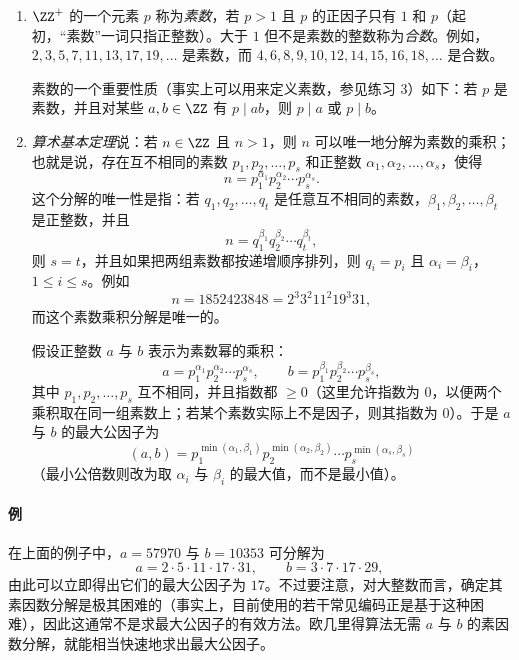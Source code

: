 \begin{enumerate}[label=(\arabic*),resume]
  \item $\ZZ^+$ 的一个元素 $p$ 称为\emph{素数}，若 $p>1$ 且 $p$ 的正因子只有 $1$ 和 $p$（起初，“素数”一词只指正整数）。大于 $1$ 但不是素数的整数称为\emph{合数}。例如，$2,3,5,7,11,13,17,19,\ldots$ 是素数，而 $4,6,8,9,10,12,14,15,16,18,\ldots$ 是合数。

  素数的一个重要性质（事实上可以用来定义素数，参见练习 3）如下：若 $p$ 是素数，并且对某些 $a,b\in\ZZ$ 有 $p\mid ab$，则 $p\mid a$ 或 $p\mid b$。

  \item \emph{算术基本定理}说：若 $n\in\ZZ$ 且 $n>1$，则 $n$ 可以唯一地分解为素数的乘积；也就是说，存在互不相同的素数 $p_1,p_2,\ldots,p_s$ 和正整数 $\alpha_1,\alpha_2,\ldots,\alpha_s$，使得
  \[
    n=p_1^{\alpha_1}p_2^{\alpha_2}\cdots p_s^{\alpha_s}.
  \]
  这个分解的唯一性是指：若 $q_1,q_2,\ldots,q_t$ 是任意互不相同的素数，$\beta_1,\beta_2,\ldots,\beta_t$ 是正整数，并且
  \[
    n=q_1^{\beta_1}q_2^{\beta_2}\cdots q_t^{\beta_t},
  \]
  则 $s=t$，并且如果把两组素数都按递增顺序排列，则 $q_i=p_i$ 且 $\alpha_i=\beta_i$，$1\leq i\leq s$。例如
  \[
    n=1852423848=2^3 3^2 11^2 19^3 31,
  \]
  而这个素数乘积分解是唯一的。

  假设正整数 $a$ 与 $b$ 表示为素数幂的乘积：
  \[
    a=p_1^{\alpha_1}p_2^{\alpha_2}\cdots p_s^{\alpha_s},
    \qquad
    b=p_1^{\beta_1}p_2^{\beta_2}\cdots p_s^{\beta_s},
  \]
  其中 $p_1,p_2,\ldots,p_s$ 互不相同，并且指数都 $\geq0$（这里允许指数为 $0$，以便两个乘积取在同一组素数上；若某个素数实际上不是因子，则其指数为 $0$）。于是 $a$ 与 $b$ 的最大公因子为
  \[
    (a,b)=p_1^{\min(\alpha_1,\beta_1)}p_2^{\min(\alpha_2,\beta_2)}\cdots p_s^{\min(\alpha_s,\beta_s)}
  \]
  （最小公倍数则改为取 $\alpha_i$ 与 $\beta_i$ 的最大值，而不是最小值）。
\end{enumerate}

\paragraph{例}
在上面的例子中，$a=57970$ 与 $b=10353$ 可分解为
\[
  a=2\cdot5\cdot11\cdot17\cdot31,
  \qquad
  b=3\cdot7\cdot17\cdot29,
\]
由此可以立即得出它们的最大公因子为 $17$。不过要注意，对大整数而言，确定其素因数分解是极其困难的（事实上，目前使用的若干常见编码正是基于这种困难），因此这通常不是求最大公因子的有效方法。欧几里得算法无需 $a$ 与 $b$ 的素因数分解，就能相当快速地求出最大公因子。

